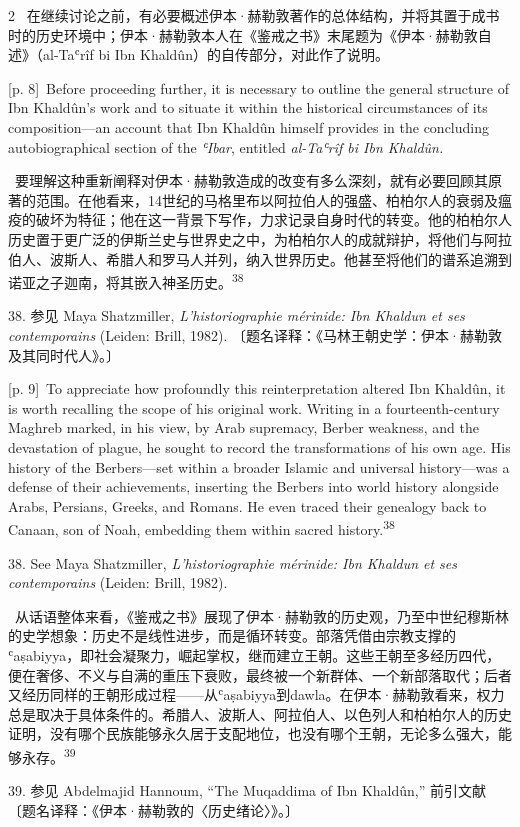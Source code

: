 \documentclass[10pt,a4paper]{article}
\begin{document}
\begin{paracol}{2}
\switchcolumn*
{\scriptsize\color{gray} [p. 8]}\ 在继续讨论之前，有必要概述伊本·赫勒敦著作的总体结构，并将其置于成书时的历史环境中；伊本·赫勒敦本人在《鉴戒之书》末尾题为《伊本·赫勒敦自述》（al-Taʿrîf bi Ibn Khaldûn）的自传部分，对此作了说明。\par
\switchcolumn
{\scriptsize\color{gray} [p. 8]}\ Before proceeding further, it is necessary to outline the general structure of Ibn Khaldûn’s work and to situate it within the historical circumstances of its composition—an account that Ibn Khaldûn himself provides in the concluding autobiographical section of the \textit{ʿIbar}, entitled \textit{al-Taʿrîf bi Ibn Khaldûn.}\par
\switchcolumn*
{\scriptsize\color{gray} [p. 9]}\ 要理解这种重新阐释对伊本·赫勒敦造成的改变有多么深刻，就有必要回顾其原著的范围。在他看来，14世纪的马格里布以阿拉伯人的强盛、柏柏尔人的衰弱及瘟疫的破坏为特征；他在这一背景下写作，力求记录自身时代的转变。他的柏柏尔人历史置于更广泛的伊斯兰史与世界史之中，为柏柏尔人的成就辩护，将他们与阿拉伯人、波斯人、希腊人和罗马人并列，纳入世界历史。他甚至将他们的谱系追溯到诺亚之子迦南，将其嵌入神圣历\mbox{史。\textsuperscript{38}}\par{\small 38. 参见 Maya Shatzmiller, \textit{L’historiographie mérinide: Ibn Khaldun et ses contemporains} (Leiden: Brill, 1982). 〔题名译释：《马林王朝史学：伊本·赫勒敦及其同时代人》。〕\par}
\switchcolumn
{\scriptsize\color{gray} [p. 9]}\ To appreciate how profoundly this reinterpretation altered Ibn Khaldûn, it is worth recalling the scope of his original work. Writing in a fourteenth-century Maghreb marked, in his view, by Arab supremacy, Berber weakness, and the devastation of plague, he sought to record the transformations of his own age. His history of the Berbers—set within a broader Islamic and universal history—was a defense of their achievements, inserting the Berbers into world history alongside Arabs, Persians, Greeks, and Romans. He even traced their genealogy back to Canaan, son of Noah, embedding them within sacred history.\nobreak\textsuperscript{38}\par{\small 38. See Maya Shatzmiller, \textit{L’historiographie mérinide: Ibn Khaldun et ses contemporains} (Leiden: Brill, 1982).\par}
\switchcolumn*
{\scriptsize\color{gray} [p. 9]}\ 从话语整体来看，《鉴戒之书》展现了伊本·赫勒敦的历史观，乃至中世纪穆斯林的史学想象：历史不是线性进步，而是循环转变。部落凭借由宗教支撑的ʿaṣabiyya，即社会凝聚力，崛起掌权，继而建立王朝。这些王朝至多经历四代，便在奢侈、不义与自满的重压下衰败，最终被一个新群体、一个新部落取代；后者又经历同样的王朝形成过程——从ʿaṣabiyya到dawla。在伊本·赫勒敦看来，权力总是取决于具体条件的。希腊人、波斯人、阿拉伯人、以色列人和柏柏尔人的历史证明，没有哪个民族能够永久居于支配地位，也没有哪个王朝，无论多么强大，能够永\mbox{存。\textsuperscript{39}}\par{\small 39. 参见 Abdelmajid Hannoum, “The Muqaddima of Ibn Khaldûn,” 前引文献 〔题名译释：《伊本·赫勒敦的〈历史绪论〉》。〕\par}

\end{paracol}
\end{document}
